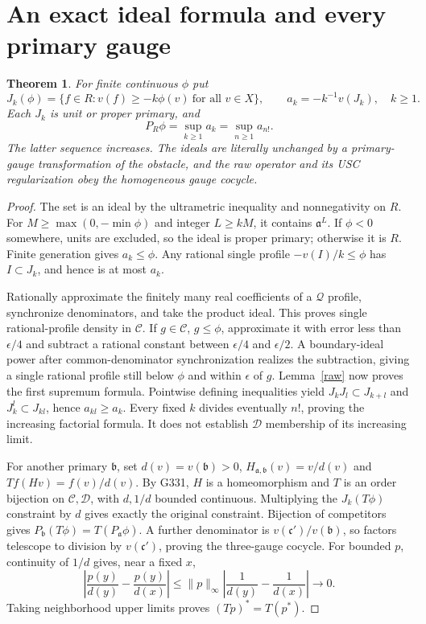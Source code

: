 \documentclass[11pt]{article}
\newtheorem{theorem}{Theorem}
\newcommand{\C}{\mathcal C}
\newcommand{\D}{\mathcal D}
\newcommand{\Q}{\mathcal Q}
\newcommand{\aideal}{\mathfrak a}
\begin{document}
\section{An exact ideal formula and every primary gauge}
\begin{theorem}\label{ideal}
For finite continuous $\phi$ put
\[
 J_k(\phi)=\{f\in R:v(f)\ge-k\phi(v)\ \text{for all }v\in X\},
 \qquad a_k=-k^{-1}v(J_k),\quad k\ge1.
\]
Each $J_k$ is unit or proper primary, and
\[
 P_R\phi=\sup_{k\ge1}a_k=\sup_{n\ge1}a_{n!}.
\]
The latter sequence increases. The ideals are literally unchanged by a
primary-gauge transformation of the obstacle, and the raw operator and its
USC regularization obey the homogeneous gauge cocycle.
\end{theorem}
\begin{proof}
The set is an ideal by the ultrametric inequality and nonnegativity on $R$.
For $M\ge\max(0,-\min\phi)$ and integer $L\ge kM$, it contains $\aideal^L$.
If $\phi<0$ somewhere, units are excluded, so the ideal is proper primary;
otherwise it is $R$. Finite generation gives $a_k\le\phi$.
Any rational single profile $-v(I)/k\le\phi$ has $I\subset J_k$, and hence
is at most $a_k$.

Rationally approximate the finitely many real coefficients of a $\Q$ profile,
synchronize denominators, and take the product ideal. This proves single
rational-profile density in $\C$. If $g\in\C$, $g\le\phi$, approximate it with
error less than $\epsilon/4$ and subtract a rational constant between
$\epsilon/4$ and $\epsilon/2$. A boundary-ideal power after common-denominator
synchronization realizes the subtraction, giving a single rational profile
still below $\phi$ and within $\epsilon$ of $g$.
Lemma~\ref{raw} now proves the first supremum formula.
Pointwise defining inequalities yield
$J_kJ_l\subset J_{k+l}$ and $J_k^l\subset J_{kl}$, hence $a_{kl}\ge a_k$.
Every fixed $k$ divides eventually $n!$, proving the increasing factorial formula.
It does not establish $\D$ membership of its increasing limit.

For another primary $\mathfrak b$, set $d(v)=v(\mathfrak b)>0$,
$H_{\aideal,\mathfrak b}(v)=v/d(v)$ and
$T f(Hv)=f(v)/d(v)$. By G331, $H$ is a homeomorphism and $T$ is an order
bijection on $\C,\D$, with $d,1/d$ bounded continuous. Multiplying the
$J_k(T\phi)$ constraint by $d$ gives exactly the original constraint.
Bijection of competitors gives $P_{\mathfrak b}(T\phi)=T(P_{\aideal}\phi)$.
A further denominator is $v(\mathfrak c')/v(\mathfrak b)$, so factors telescope
to division by $v(\mathfrak c')$, proving the three-gauge cocycle.
For bounded $p$, continuity of $1/d$ gives, near a fixed $x$,
\[
 \left|\frac{p(y)}{d(y)}-\frac{p(y)}{d(x)}\right|
 \le\|p\|_\infty\left|\frac1{d(y)}-\frac1{d(x)}\right|\longrightarrow0.
\]
Taking neighborhood upper limits proves $(Tp)^*=T(p^*)$.
\end{proof}
\end{document}
